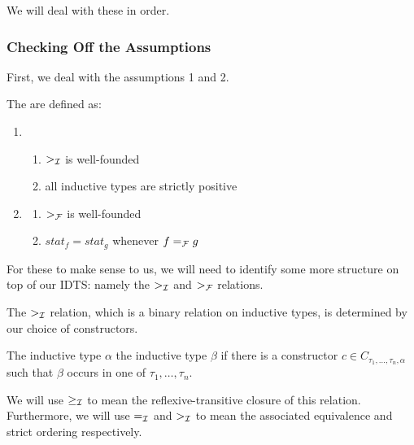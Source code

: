 We will deal with these in order.

\subsubsection{Checking Off the Assumptions}

First, we deal with the assumptions 1 and 2.

\begin{definition}
  The  are defined as:
  \begin{enumerate}
  \item 
    \begin{enumerate}
      \item \label{ass:inductive-well-founded} $>_{\mathcal{I}}$ is well-founded
      \item \label{ass:positive-types} all inductive types are
        strictly positive
    \end{enumerate}
  \item \label{ass:function-symbols}
    \begin{enumerate}
      \item \label{ass:functions-well-founded} $>_{\mathcal{F}}$ is well-founded
      \item \label{ass:stat} $stat_f = stat_g$ whenever $f =_{\mathcal{F}} g$
    \end{enumerate}
  \end{enumerate}
\end{definition}

For these to make sense to us, we will need to identify some more structure
on top of our IDTS: namely the $>_{\mathcal{I}}$ and $>_{\mathcal{F}}$ relations.

The $>_{\mathcal{I}}$ relation, which is a binary relation on inductive types, is
determined by our choice of constructors.

\begin{definition}
  The inductive type $\alpha$  the inductive type $\beta$
  if there is a constructor $c \in C_{\tau_1,\ldots,\tau_n,\alpha}$ such
  that $\beta$ occurs in one of $\tau_1, \ldots, \tau_n$.
  
  We will use $\ge_{\mathcal{I}}$ to mean the reflexive-transitive closure of this
  relation. Furthermore, we will use $=_{\mathcal{I}}$ and $>_{\mathcal{I}}$ to mean the
  associated equivalence and strict ordering respectively.
\end{definition}


